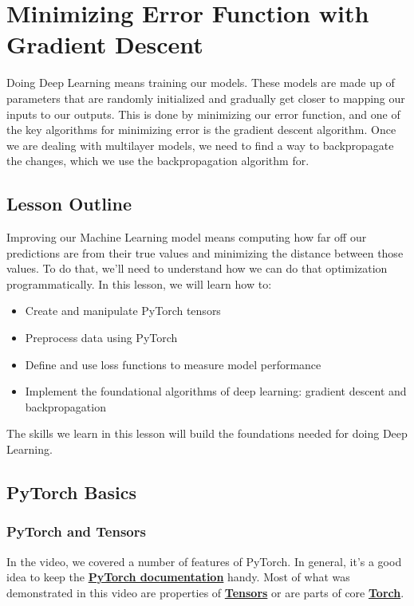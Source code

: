 \chapter{Minimizing Error Function with Gradient Descent}
Doing Deep Learning means training our models. These models are made up of parameters that are randomly initialized and gradually get closer to mapping our inputs to our outputs. This is done by minimizing our error function, and one of the key algorithms for minimizing error is the gradient descent algorithm. Once we are dealing with multilayer models, we need to find a way to backpropagate the changes, which we use the backpropagation algorithm for.


\section{Lesson Outline}
Improving our Machine Learning model means computing how far off our predictions are from their true values and minimizing the distance between those values. To do that, we'll need to understand how we can do that optimization programmatically. In this lesson, we will learn how to:

\begin{itemize}
    \item Create and manipulate PyTorch tensors
    \item Preprocess data using PyTorch
    \item Define and use loss functions to measure model performance
    \item Implement the foundational algorithms of deep learning: gradient descent and backpropagation
\end{itemize}
The skills we learn in this lesson will build the foundations needed for doing Deep Learning.

\section{PyTorch Basics}

\subsection{PyTorch and Tensors}

In the video, we covered a number of features of PyTorch. In general, it's a good idea to keep the \href{https://pytorch.org/docs/stable/index.html}{\textbf{PyTorch documentation}} handy. Most of what was demonstrated in this video are properties of \href{https://pytorch.org/docs/stable/tensors.html}{\textbf{Tensors}} or are parts of core \href{https://pytorch.org/docs/stable/torch.html}{\textbf{Torch}}.

